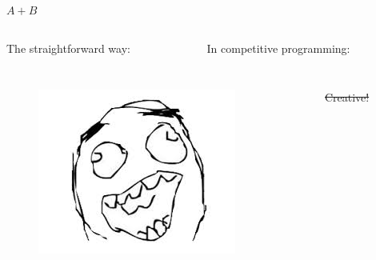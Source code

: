 \begin{frame}{$A+B$}
\begin{columns}
  \begin{column}{0.48\columnwidth}
   The straightforward way:
  \inputminted[linenos=true, fontsize=\scriptsize, bgcolor=mygray, ]{python}{./src/plus0.py}
  \end{column}
  \begin{column}{0.48\columnwidth}
     In competitive programming:
    \inputminted[linenos=true, fontsize=\scriptsize, bgcolor=mygray, ]{python}{./src/plus1.py}
  \end{column}
\end{columns}

\begin{columns}
  \begin{column}{0.6\columnwidth}
    \begin{figure}
      \centering
      \includegraphics[width=.35\textwidth]{pic/rage.jpeg}
    \end{figure}
  \end{column}
  \begin{column}{0.4\columnwidth}
     \st{Creative!}
  \end{column}
\end{columns}
\end{frame}
